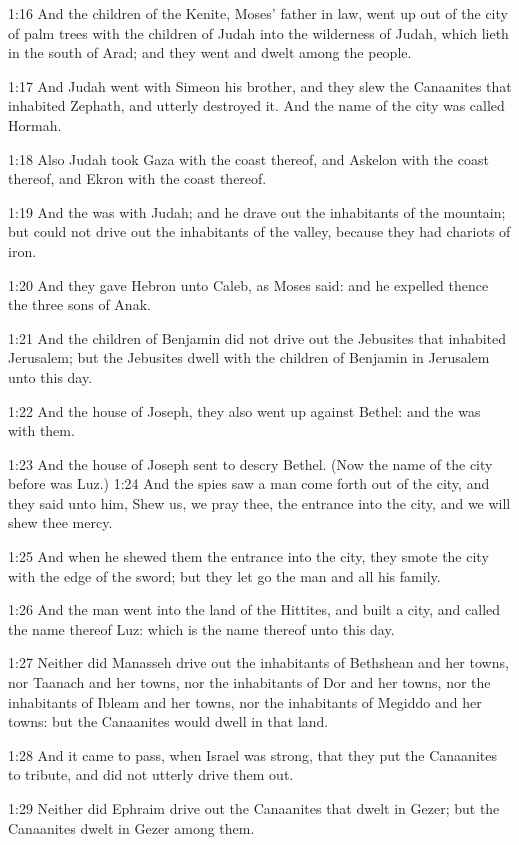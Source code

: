 1:16 And the children of the Kenite, Moses' father in law, went up out of the city of palm trees with the children of Judah into the wilderness of Judah, which lieth in the south of Arad; and they went and dwelt among the people.

1:17 And Judah went with Simeon his brother, and they slew the Canaanites that inhabited Zephath, and utterly destroyed it. And the name of the city was called Hormah.

1:18 Also Judah took Gaza with the coast thereof, and Askelon with the coast thereof, and Ekron with the coast thereof.

1:19 And the \LORD was with Judah; and he drave out the inhabitants of the mountain; but could not drive out the inhabitants of the valley, because they had chariots of iron.

1:20 And they gave Hebron unto Caleb, as Moses said: and he expelled thence the three sons of Anak.

1:21 And the children of Benjamin did not drive out the Jebusites that inhabited Jerusalem; but the Jebusites dwell with the children of Benjamin in Jerusalem unto this day.

1:22 And the house of Joseph, they also went up against Bethel: and the \LORD was with them.

1:23 And the house of Joseph sent to descry Bethel. (Now the name of the city before was Luz.)  1:24 And the spies saw a man come forth out of the city, and they said unto him, Shew us, we pray thee, the entrance into the city, and we will shew thee mercy.

1:25 And when he shewed them the entrance into the city, they smote the city with the edge of the sword; but they let go the man and all his family.

1:26 And the man went into the land of the Hittites, and built a city, and called the name thereof Luz: which is the name thereof unto this day.

1:27 Neither did Manasseh drive out the inhabitants of Bethshean and her towns, nor Taanach and her towns, nor the inhabitants of Dor and her towns, nor the inhabitants of Ibleam and her towns, nor the inhabitants of Megiddo and her towns: but the Canaanites would dwell in that land.

1:28 And it came to pass, when Israel was strong, that they put the Canaanites to tribute, and did not utterly drive them out.

1:29 Neither did Ephraim drive out the Canaanites that dwelt in Gezer; but the Canaanites dwelt in Gezer among them.

